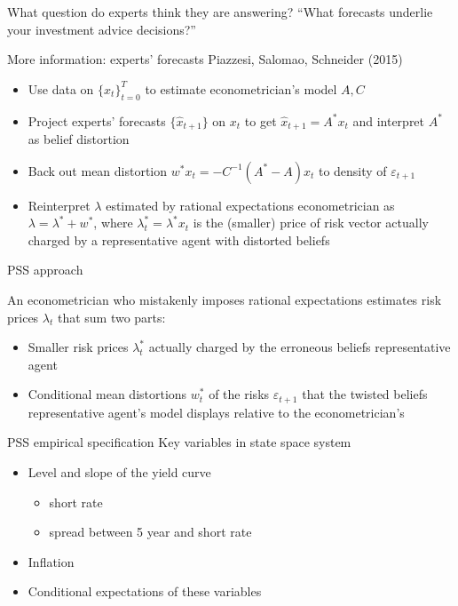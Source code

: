 \documentclass{beamer}
\theoremstyle{Definition}
\begin{document}
\begin{frame}{What question do experts think they are answering?}
``What forecasts underlie your investment advice decisions?''

\end{frame}

\begin{frame}{More information: experts' forecasts}
Piazzesi, Salomao, Schneider (2015)

\begin{itemize}
\item Use data on $\{ x_{t} \}_{t=0}^T$ to estimate econometrician's model $A, C$
\item Project experts' forecasts  $\{\hat x_{t+1}\}$ on $x_t$ to get $\hat x_{t+1} =  A^* x_t  $ and interpret $A^*$  as belief distortion
\item Back out mean  distortion  $ w^* x_t= - C^{-1} (A^* - A)x_t$ to density of $\varepsilon_{t+1}$
\item Reinterpret $\lambda $ estimated by rational expectations econometrician as $\lambda = \lambda^*  + w^*$, where
$\lambda^*_t =  \lambda^* x_t$ is the (smaller) price of risk vector actually charged  by a  representative agent with distorted beliefs
\end{itemize}

\end{frame}


\begin{frame}{PSS approach}

An econometrician  who mistakenly imposes rational expectations  estimates  risk prices $\lambda_t$ that 
 sum two parts: %
\begin{itemize}
\item Smaller risk prices $\lambda_t^*$ actually charged by the erroneous beliefs representative agent
\item Conditional mean distortions $w_t^*$ of the risks $\varepsilon_{t+1}$ that the twisted beliefs representative  agent's model displays relative to the econometrician's
\end{itemize}


\end{frame}

\begin{frame}{PSS empirical specification}
 Key variables in state space system
 \begin{itemize}
 \item Level and slope of the yield curve
    \begin{itemize}
    \item short rate
    \item spread between 5 year and short rate
    \end{itemize}
  \item Inflation
  \item Conditional expectations of these variables
 \end{itemize}


\end{frame}
\end{document}
